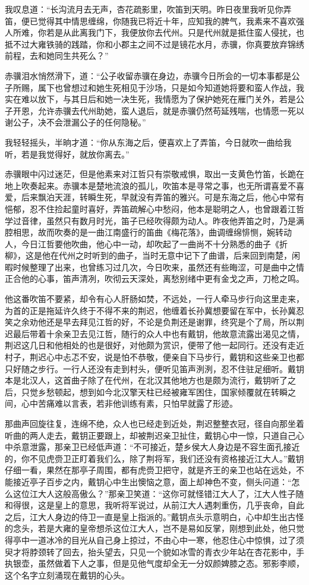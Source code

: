 我叹息道：“长沟流月去无声，杏花疏影里，吹笛到天明。昨日夜里我听见你弄笛，便已觉得其中情思缠绵，你随我已将近十年，应知我的脾气，我素来不喜欢强人所难，你若是从此离我门下，我便放你去代州。只是代州就是抵住蛮人侵扰，也抵不过大雍铁骑的践踏，你和小郡主之间不过是镜花水月，赤骥，你真要放弃锦绣前程，去和她同生共死么？”

赤骥泪水悄然滑下，道：“公子收留赤骥在身边，赤骥今日所会的一切本事都是公子所赐，属下也曾想过和她生死相见于沙场，只是如今知道她将要和蛮人作战，我实在难以放下，与其日后和她一决生死，我情愿为了保护她死在雁门关外，若是公子开恩，允许赤骥去代州助她，蛮人退后，就是赤骥仍然苟延残喘，也情愿一死以谢公子，决不会泄漏公子的任何隐秘。”

我轻轻摇头，半晌才道：“你从东海之后，便喜欢上了弄笛，今日就吹一曲给我听，若是我觉得好，就放你离去。”

赤骥眼中闪过迷茫，但是他素来对江哲只有崇敬戒惧，取出一支黄色竹笛，长跪在地上吹奏起来。赤骥本是楚地流浪的孤儿，吹笛本是寻常之事，也无所谓喜爱不喜爱，后来飘泊天涯，转瞬生死，早就没有弄笛的雅兴。可是东海之后，他心中常有悒郁，忍不住捡起童时喜好，弄笛疏解心中愁闷，他本是聪明之人，也曾跟着江哲学过音律，虽然只有数月时光，笛子已经吹得颇为动人。昨夜他弄笛之时，乃是满腔相思，故而吹奏的是一曲江南盛行的笛曲《梅花落》，曲调缠绵悱恻，婉转动人，今日江哲要他吹曲，他心中一动，却吹起了一曲尚不十分熟悉的曲子《折柳》，这是他在代州之时听到的曲子，当时无意中记下了曲谱，后来回到南楚，闲暇时候整理了出来，也曾练习过几次，今日吹来，虽然还有些晦涩，可是曲中之情正合他的心事，笛声清冽，吹彻云天深处，离愁别绪中更有金戈之声，刀枪之鸣。

他这番吹笛不要紧，却令有心人肝肠如焚，不远处，一行人牵马步行向这里走来，为首的正是拖延许久终于不得不来的荆迟，他缠着长孙冀想要留在军中，长孙冀忍笑之余劝他还是早去拜见江哲的好，不论是负荆还是谢罪，终究是个了局，所以荆迟最后带着十余亲卫去见江哲，随行的众人中也有戴钥，他故意流露出渴见之情，荆迟这几日和他相处的也是很好，对他颇为赏识，便带了他一起同行。还没有走近村子，荆迟心中忐忑不安，说是怕不恭敬，便亲自下马步行，戴钥和这些亲卫也都只好随之步行。一行人还没有走到村头，便听见笛声洌洌，忍不住驻足细听。戴钥本是北汉人，这首曲子除了在代州，在北汉其他地方也是颇为流行，戴钥听了之后，只觉乡愁顿起，想到如今北汉擎天柱已经被雍军困住，国家倾覆就在转瞬之间，心中苦痛难以言表，若非他训练有素，只怕早就露了形迹。

那曲声回旋往复，连绵不绝，众人也已经走到近处，荆迟整整衣冠，径自向那坐着听曲的两人走去，戴钥正要跟上，却被荆迟亲卫扯住，戴钥心中一惊，只道自己心中杀意泄露，那亲卫已经低声道：“不可接近，楚乡侯大人身边是不容生面孔接近的，你不见虎赍卫正盯着我们么，除了荆将军，我们还没有资格接近江大人。”戴钥仔细一看，果然在那亭子周围，都有虎赍卫把守，就是齐王的亲卫也站在远处，不能接近亭子百步之内，戴钥心中生出懊恼之意，面上却神色不变，侧头问道：“怎么这位江大人这般高傲么？”那亲卫笑道：“这你可就怪错江大人了，江大人性子随和得很，这是皇上的意思，我听将军说过，从前江大人遇刺重伤，几乎丧命，自此之后，江大人身边的侍卫一直是皇上指派的。”戴钥点头示意明白，心中却生出古怪的念头，若是大雍的皇帝想杀这位江大人，岂不是易如反掌，刚想到此处，他只觉得亭中一道冰冷的目光从自己身上掠过，不由心中一寒，他忍住心中惊惧，过了须臾才将脖颈转了回去，抬头望去，只见一个貌如冰雪的青衣少年站在杏花影中，手执银壶，虽然做着下人之事，但是见他气度却全无一分奴颜婢膝之态。邪影李顺，这个名字立刻涌现在戴钥的心头。


